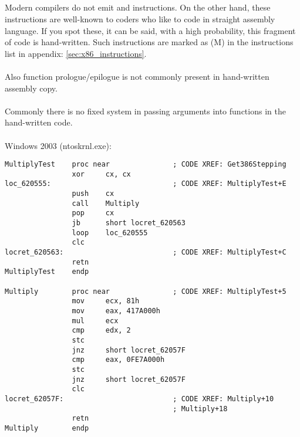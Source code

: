\subsection{}

{Modern compilers do not emit  and  instructions.
On the other hand, these instructions are well-known to coders who like to code in straight assembly language.
If you spot these, it can be said, with a high probability, this fragment of code is hand-written.
Such instructions are marked as (M) in the instructions list in appendix: \ref{sec:x86_instructions}.}\\
\\
{Also function prologue/epilogue is not commonly present in hand-written assembly copy.}\\
\\
{Commonly there is no fixed system in passing arguments into functions in the hand-written
code}.\\
\\
 Windows 2003 
(ntoskrnl.exe):

\begin{lstlisting}
MultiplyTest    proc near               ; CODE XREF: Get386Stepping
                xor     cx, cx
loc_620555:                             ; CODE XREF: MultiplyTest+E
                push    cx
                call    Multiply
                pop     cx
                jb      short locret_620563
                loop    loc_620555
                clc
locret_620563:                          ; CODE XREF: MultiplyTest+C
                retn
MultiplyTest    endp

Multiply        proc near               ; CODE XREF: MultiplyTest+5
                mov     ecx, 81h
                mov     eax, 417A000h
                mul     ecx
                cmp     edx, 2
                stc
                jnz     short locret_62057F
                cmp     eax, 0FE7A000h
                stc
                jnz     short locret_62057F
                clc
locret_62057F:                          ; CODE XREF: Multiply+10
                                        ; Multiply+18
                retn
Multiply        endp
\end{lstlisting}


